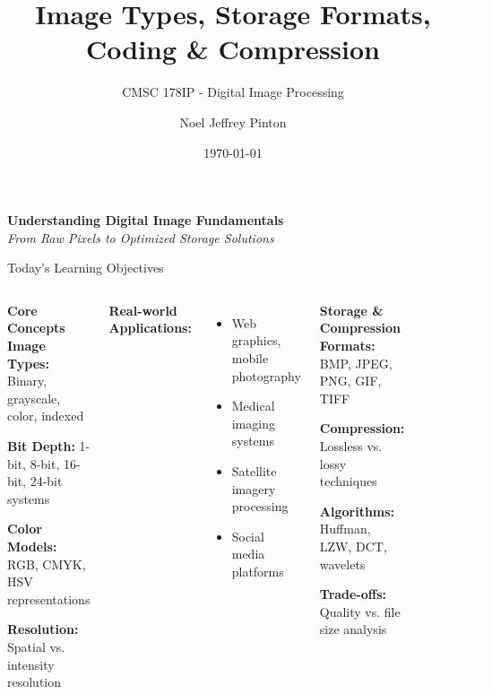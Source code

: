 \documentclass[aspectratio=1610,8pt]{beamer}
\title{Image Types, Storage Formats, Coding \& Compression}
\subtitle{CMSC 178IP - Digital Image Processing}
\author{Noel Jeffrey Pinton}
\institute{Department of Computer Science\\University of the Philippines - Cebu}
\date{\today}
\newcommand{\highlight}[1]{\textcolor{navyblue}{\textbf{#1}}}
\begin{document}
\begin{frame}
\titlepage
\begin{center}
\vspace{0.5cm}
\begin{tcolorbox}[colback=lightgray,colframe=navyblue,width=0.8\textwidth,center,boxrule=1pt]
\centering
\textbf{Understanding Digital Image Fundamentals}\\
\textit{From Raw Pixels to Optimized Storage Solutions}
\end{tcolorbox}
\end{center}
\end{frame}

\begin{frame}{Today's Learning Objectives}
\begin{columns}[T]
\begin{alertblock}{\highlight{Core Concepts}}
\textbf{Image Types:} Binary, grayscale, color, indexed

\textbf{Bit Depth:} 1-bit, 8-bit, 16-bit, 24-bit systems

\textbf{Color Models:} RGB, CMYK, HSV representations

\textbf{Resolution:} Spatial vs. intensity resolution
\end{alertblock}

\textbf{Real-world Applications:}
\begin{itemize}
    \item Web graphics, mobile photography
    \item Medical imaging systems
    \item Satellite imagery processing
    \item Social media platforms
\end{itemize}

\begin{alertblock}{\highlight{Storage \& Compression}}
\textbf{Formats:} BMP, JPEG, PNG, GIF, TIFF

\textbf{Compression:} Lossless vs. lossy techniques

\textbf{Algorithms:} Huffman, LZW, DCT, wavelets

\textbf{Trade-offs:} Quality vs. file size analysis
\end{alertblock}

\begin{center}
\vspace{0.5cm}
\begin{tcolorbox}[colback=steelblue,colframe=steelblue,width=0.9\textwidth,center,boxrule=1pt]
\centering
\textcolor{white}{\textbf{From raw pixels to optimized storage solutions!}}
\end{tcolorbox}
\end{center}

\end{columns}
\end{frame}
\end{document}
